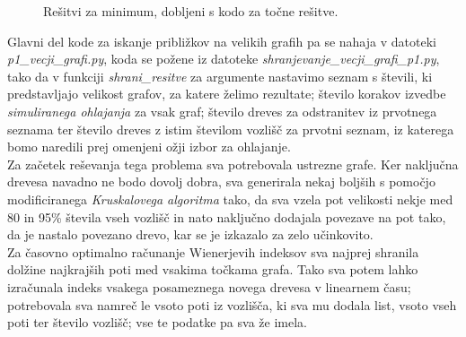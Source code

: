 \documentclass[a4paper, 12 pt]{article}
\begin{document}
\begin{figure}[H]
    \centering
    \qquad
    \caption{Rešitvi za minimum, dobljeni s kodo za točne rešitve.}
    \label{p1min}
\end{figure}

\pagebreak

Glavni del kode za iskanje približkov na velikih grafih pa se nahaja v datoteki \textit{p1\_vecji\_grafi.py}, koda se požene iz datoteke \textit{shranjevanje\_vecji\_grafi\_p1.py}, tako da v funkciji \textit{shrani\_resitve} za argumente nastavimo seznam s števili, ki predstavljajo velikost grafov, za katere želimo rezultate; število korakov izvedbe \textit{simuliranega ohlajanja} za vsak graf; število dreves za odstranitev iz prvotnega seznama ter število dreves z istim številom vozlišč za prvotni seznam, iz katerega bomo naredili prej omenjeni ožji izbor za ohlajanje.\\

Za začetek reševanja tega problema sva potrebovala ustrezne grafe. Ker naključna drevesa navadno ne bodo dovolj dobra, sva generirala nekaj boljših s pomočjo modificiranega \textit{Kruskalovega algoritma} tako, da sva vzela pot velikosti nekje med 80 in 95\% števila vseh vozlišč in nato naključno dodajala povezave na pot tako, da je nastalo povezano drevo, kar se je izkazalo za zelo učinkovito.\\

Za časovno optimalno računanje Wienerjevih indeksov sva najprej shranila dolžine najkrajših poti med vsakima točkama grafa. Tako sva potem lahko izračunala indeks vsakega posameznega novega drevesa v linearnem času; potrebovala sva namreč le vsoto poti iz vozlišča, ki sva mu dodala list, vsoto vseh poti ter število vozlišč; vse te podatke pa sva že imela. \\
\end{document}
